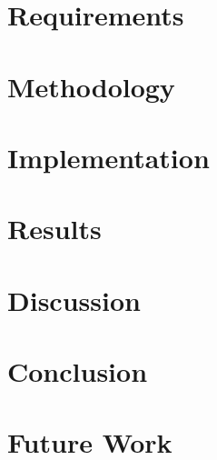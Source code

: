 \documentclass[a4paper,12pt,oneside]{book}
\begin{document}
\chapter{Requirements}

\chapter{Methodology}

\chapter{Implementation}

\chapter{Results}

\chapter{Discussion}

\chapter{Conclusion}


\chapter{Future Work}





%   
\end{document}
